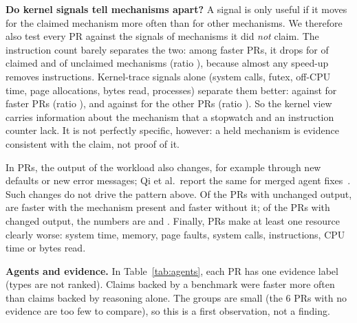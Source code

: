 \textbf{Do kernel signals tell mechanisms apart?} A signal is only useful
if it moves for the claimed mechanism more often than for other
mechanisms. We therefore also test every PR against the signals of
mechanisms it did \emph{not} claim. The instruction count barely separates
the two: among faster PRs, it drops for \iClaimedFast of claimed and
\iUnclaimedFast of unclaimed mechanisms (ratio \iRatioFast), because
almost any speed-up removes instructions. Kernel-trace signals alone
(system calls, futex, off-CPU time, page allocations, bytes read,
processes) separate them better: \kClaimedFast against \kUnclaimedFast
for faster PRs (ratio \kRatioFast), and \kClaimedSlow against
\kUnclaimedSlow for the other PRs (ratio \kRatioSlow). So the kernel view
carries information about the mechanism that a stopwatch and an
instruction counter lack. It is not perfectly specific, however: a held
mechanism is evidence consistent with the claim, not proof of it.

In \nBehaviour PRs, the output of the workload also changes, for example
through new defaults or new error messages; Qi et al.\ report the same
for merged agent fixes~\cite{qi2026merged}. Such changes do not drive the
pattern above. Of the \nSame PRs with unchanged output, \qFHSame are
faster with the mechanism present and \qFNSame faster without it; of the
\nChg PRs with changed output, the numbers are \qFHChg and \qFNChg.
Finally, \nHiddenCost PRs make at least one resource clearly worse: system
time, memory, page faults, system calls, instructions, CPU time or bytes
read.

\begin{table}[t]
\caption{Analysed PRs by agent and by the evidence the PR offers for its
claim: number of PRs, faster, and claimed mechanism held.}
\label{tab:agents}
\centering\footnotesize

\end{table}

\textbf{Agents and evidence.} In Table~\ref{tab:agents}, each PR has one
evidence label (types are not ranked). Claims backed by a benchmark were
faster more often than claims backed by reasoning alone. The groups are
small (the 6 PRs with no evidence are too few to compare), so this is a
first observation, not a finding.


